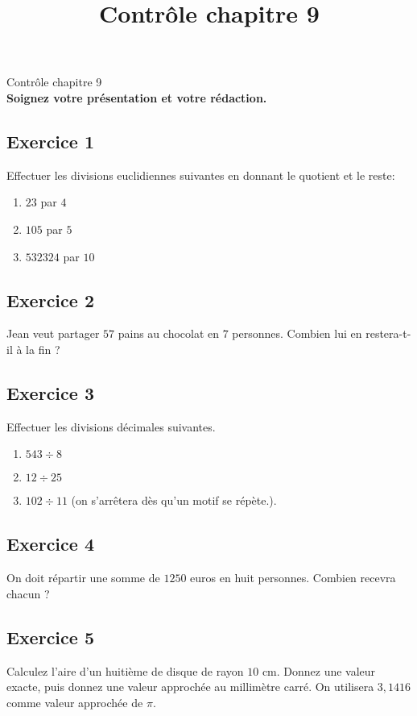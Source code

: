 \documentclass[14pt]{extreport}
\title{Contrôle chapitre 9}
\date{}
\theoremstyle{plain}
\begin{document}
\begin{center}{\Large Contrôle chapitre 9}\\ \textbf{Soignez votre présentation et votre rédaction.}\end{center}
 
 
 \subsection*{Exercice 1}
 
 Effectuer les divisions euclidiennes suivantes en donnant le quotient et le reste: 
 \begin{enumerate}
 \item $23$ par $4$ 
 \item $105$ par $5$ 
 \item $532 324$ par $10$
 \end{enumerate}
 
 \subsection*{Exercice 2}
 
 Jean veut partager $57$ pains au chocolat en $7$ personnes. Combien lui en restera-t-il à la fin ? 
 
 \subsection*{Exercice 3}
 	Effectuer les divisions décimales suivantes. 
 	\begin{enumerate}
 	\item $543\div 8$
 	\item $12 \div 25$
 	\item $102\div11$ (on s'arrêtera dès qu'un motif se répète.).
\end{enumerate} 	 
\subsection*{Exercice 4}

On doit répartir une somme de $1 250$ euros en huit personnes. Combien recevra chacun ? 

\subsection*{Exercice 5}

Calculez l'aire d'un huitième de disque de rayon $10$ cm. Donnez une valeur exacte, puis donnez une valeur approchée au millimètre carré. On utilisera $3,1416$ comme valeur approchée de $\pi$. 
\end{document}
